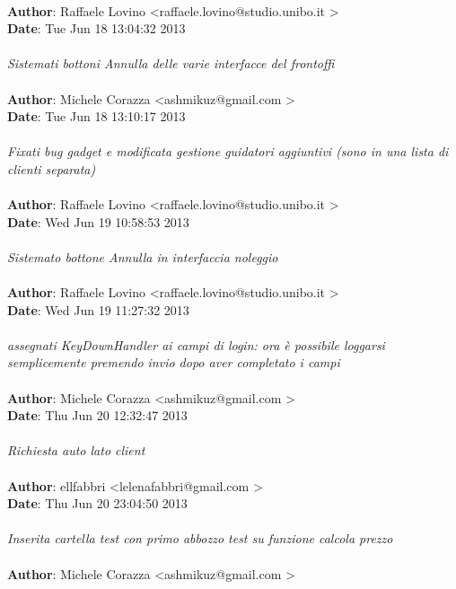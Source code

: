 \documentclass[a4paper,12pt]{article} %
\begin{document}
\\
\textbf{Author}: Raffaele Lovino \textless raffaele.lovino@studio.unibo.it \textgreater \\
\textbf{Date}:   Tue Jun 18 13:04:32 2013 \\
\\
    \emph{Sistemati bottoni Annulla delle varie interfacce del frontoffi}\\
\\
\textbf{Author}: Michele Corazza \textless ashmikuz@gmail.com \textgreater \\
\textbf{Date}:   Tue Jun 18 13:10:17 2013 \\
\\
    \emph{Fixati bug gadget e modificata gestione guidatori aggiuntivi (sono in una lista di clienti separata)}\\
\\
\textbf{Author}: Raffaele Lovino \textless raffaele.lovino@studio.unibo.it \textgreater \\
\textbf{Date}:   Wed Jun 19 10:58:53 2013 \\
\\
    \emph{Sistemato bottone Annulla in interfaccia noleggio}\\
\\
\textbf{Author}: Raffaele Lovino \textless raffaele.lovino@studio.unibo.it \textgreater \\
\textbf{Date}:   Wed Jun 19 11:27:32 2013 \\
\\
    \emph{assegnati KeyDownHandler ai campi di login: ora è possibile loggarsi semplicemente premendo invio dopo aver completato i campi}\\
\\
\textbf{Author}: Michele Corazza \textless ashmikuz@gmail.com \textgreater \\
\textbf{Date}:   Thu Jun 20 12:32:47 2013 \\
\\
    \emph{Richiesta auto lato client}\\
\\
\textbf{Author}: ellfabbri \textless lelenafabbri@gmail.com \textgreater \\
\textbf{Date}:   Thu Jun 20 23:04:50 2013 \\
\\
    \emph{Inserita cartella test con primo abbozzo test su funzione calcola prezzo}\\
\\
\textbf{Author}: Michele Corazza \textless ashmikuz@gmail.com \textgreater \\
\end{document}
